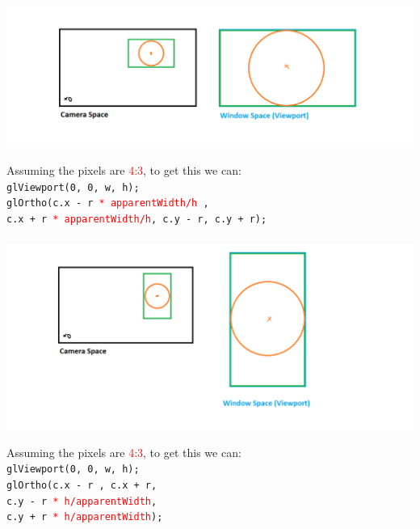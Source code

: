 \documentclass{beamer}
\begin{document}
\begin{frame}
    \frametitle{}

    \begin{center}
        \includegraphics[scale=0.4]{q7-cam-win-2.png}
    \end{center}

    \begin{tcolorbox}
        \small
        Assuming the pixels are \textcolor{red}{4:3}, to get this we can:\\
        \texttt{glViewport(0, 0, w, h);}\\
        \texttt{glOrtho(c.x - r \textcolor{red}{* \texttt{apparentWidth}/h} , \\
        c.x + r \textcolor{red}{* \texttt{apparentWidth}/h}, c.y - r, c.y + r);}
    \end{tcolorbox}

\end{frame}

\begin{frame}
    \frametitle{}

    \begin{center}
        \includegraphics[scale=0.4]{q7-cam-win-3.png}
    \end{center}

    \begin{tcolorbox}
        \small
        Assuming the pixels are \textcolor{red}{4:3}, to get this we can:\\
        \texttt{glViewport(0, 0, w, h);}\\
        \texttt{glOrtho(c.x - r , c.x + r, \\
        c.y - r \textcolor{red}{* h/\textcolor{red}{apparentWidth}},\\
        c.y + r \textcolor{red}{* h/\textcolor{red}{apparentWidth}});}
    \end{tcolorbox}

\end{frame}
\end{document}
